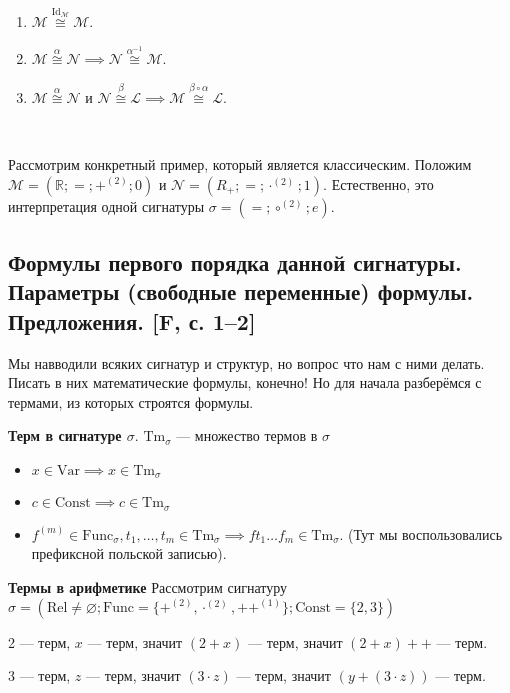 \documentclass[a4paper, fleqn]{article}
\begin{document}
    \begin{proposition}
        \begin{enumerate}
            \item $\mathcal{M} \overset{\text{Id}_{\mathcal{M}}}{\cong} \mathcal{M}$.
            \item $\mathcal{M} \overset{\alpha}{\cong} \mathcal{N} \implies \mathcal{N} \overset{\alpha^{-1}}{\cong} \mathcal{M}$.
            \item $\mathcal{M} \overset{\alpha}{\cong} \mathcal{N}$ и $\mathcal{N} \overset{\beta}{\cong} \mathcal{L} \implies \mathcal{M} \overset{\beta \circ \alpha}{\cong} \mathcal{L}$.
        \end{enumerate}
    \end{proposition}~
    \begin{example}
    Рассмотрим конкретный пример, который является классическим.
    Положим $\mathcal{M} = \left( \mathbb{R}; =; +^{(2)}; 0 \right)$ и $\mathcal{N} = \left( R_{+}; =; \cdot^{(2)}; 1 \right)$.
    Естественно, это интерпретация одной сигнатуры $\sigma = \left( =; \circ^{(2)}; e \right)$.
    \end{example}
    \subsection{Формулы первого порядка данной сигнатуры. Параметры (свободные переменные) формулы. Предложения. [F, с. 1–2]}
    Мы навводили всяких сигнатур и структур, но вопрос что нам с ними делать. Писать в них
    математические формулы, конечно! Но для начала разберёмся с термами, из которых строятся формулы.

    \begin{definition}
        \textbf{Терм в сигнатуре $\sigma$}. $\text{Tm}_\sigma$ --- множество термов в $\sigma$
        \begin{itemize}
            \item $x \in \text{Var} \implies x \in \text{Tm}_\sigma$
            \item $c \in \text{Const} \implies c \in \text{Tm}_\sigma$
            \item $f^{(m)} \in \text{Func}_\sigma, t_1, \dots, t_m \in \text{Tm}_\sigma
            \implies f t_1 \dots f_m \in \text{Tm}_\sigma$. (Тут мы воспользовались префиксной 
            польской записью).
        \end{itemize}
    \end{definition}

    \begin{example}
        \textbf{Термы в арифметике}
        Рассмотрим сигнатуру $\sigma = (\text{Rel} \neq \varnothing; \text{Func}=\{+^{(2)}, \cdot^{(2)},
        ++^{(1)}\}; \text{Const}=\{2,3\})$

        2 --- терм, $x$ --- терм, значит $(2 + x)$ --- терм, значит $(2 + x)++$ --- терм.

        3 --- терм, $z$ --- терм, значит $(3 \cdot z)$ --- терм, значит $(y + (3 \cdot z))$ --- терм.
    \end{example}
\end{document}
